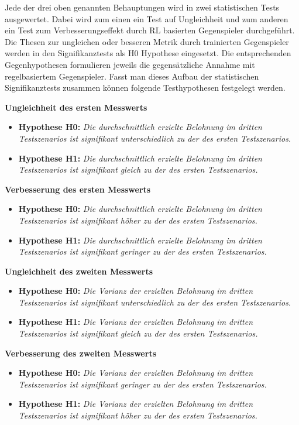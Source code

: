 Jede der drei oben genannten Behauptungen wird in zwei statistischen Tests ausgewertet.
Dabei wird zum einen ein Test auf Ungleichheit und zum anderen ein Test zum Verbesserungseffekt durch RL basierten Gegenspieler durchgeführt.
Die Thesen zur ungleichen oder besseren Metrik durch trainierten Gegenspieler werden in den Signifikanztests als H0 Hypothese eingesetzt.
Die entsprechenden Gegenhypothesen formulieren jeweils die gegensätzliche Annahme mit regelbasiertem Gegenspieler. 
Fasst man dieses Aufbau der statistischen Signifikanztests zusammen können folgende Testhypothesen festgelegt werden. 

\textbf{Ungleichheit des ersten Messwerts}
\begin{itemize}
    \item \textbf{Hypothese H0:} \textit{Die durchschnittlich erzielte Belohnung im dritten Testszenarios ist signifikant unterschiedlich zu der des ersten Testszenarios.}
    \item \textbf{Hypothese H1:} \textit{Die durchschnittlich erzielte Belohnung im dritten Testszenarios ist signifikant gleich zu der des ersten Testszenarios.}
\end{itemize}

\textbf{Verbesserung des ersten Messwerts}
\begin{itemize}
    \item \textbf{Hypothese H0:} \textit{Die durchschnittlich erzielte Belohnung im dritten Testszenarios ist signifikant höher zu der des ersten Testszenarios.}
    \item \textbf{Hypothese H1:} \textit{Die durchschnittlich erzielte Belohnung im dritten Testszenarios ist signifikant geringer zu der des ersten Testszenarios.}
\end{itemize}

\textbf{Ungleichheit des zweiten Messwerts}
\begin{itemize}
    \item \textbf{Hypothese H0:} \textit{Die Varianz der erzielten Belohnung im dritten Testszenarios ist signifikant unterschiedlich zu der des ersten Testszenarios.}
    \item \textbf{Hypothese H1:} \textit{Die Varianz der erzielten Belohnung im dritten Testszenarios ist signifikant gleich zu der des ersten Testszenarios.}
\end{itemize}

\textbf{Verbesserung des zweiten Messwerts}
\begin{itemize}
    \item \textbf{Hypothese H0:} \textit{Die Varianz der erzielten Belohnung im dritten Testszenarios ist signifikant geringer zu der des ersten Testszenarios.}
    \item \textbf{Hypothese H1:} \textit{Die Varianz der erzielten Belohnung im dritten Testszenarios ist signifikant höher zu der des ersten Testszenarios.}
\end{itemize}

